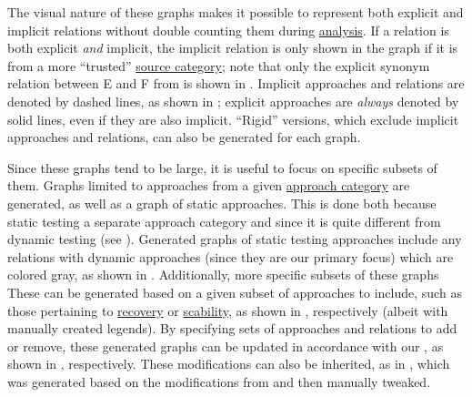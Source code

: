 {        The visual nature of these graphs makes it possible to represent both
        explicit and implicit relations without double counting them during
        \hyperref[discrep-analysis]{analysis}.
        If a relation is both explicit \emph{and} implicit, the implicit relation
        is only shown in the graph if it is from a more ``trusted''
        \hyperref[sources]{source category}; note that only the explicit
        synonym relation between E and F
        from  is shown in .
        Implicit approaches and relations are denoted by dashed lines, as shown
        in ; explicit approaches are
        \emph{always} denoted by solid lines, even if they are also implicit.
        ``Rigid'' versions, which exclude implicit approaches and relations,
        can also be generated for each graph.

    \fi
    Since these graphs tend to be large, it is useful to focus on specific
    subsets of them. \ifnotpaper Graphs limited to approaches from a given
        \hyperref[categories-observ]{approach category} are generated, as well
        as a graph of static approaches. This is done both because
        \citet[Fig.~2]{IEEE2022}  static testing a
        separate approach category and since it is quite different from dynamic
        testing (see ). Generated graphs of static testing
        approaches include any relations with dynamic approaches (since they
        are our primary focus) which are colored gray, as shown in
        . Additionally, more specific subsets of
        these graphs \else These \fi can be generated based on a given subset
    of approaches to include, such as those pertaining to
    \hyperref[recov-discrep]{recovery} or \hyperref[scal-discrep]{scability},
    as shown in ,
    respectively (albeit with manually created legends). By specifying sets of
    approaches and relations to add or remove, these generated graphs can be
    updated in accordance with our , as shown in
    , respectively.
    These modifications can also be inherited, as in ,
    which was generated based on the modifications from
     and then
    manually tweaked.}

